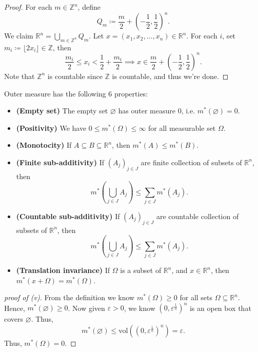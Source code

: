 \begin{proof}
    For each \(m \in \mathbb{Z} ^n\), define 
    \[
        Q_m \coloneqq \frac{m}{2} + \left( -\frac{1}{2}, \frac{1}{2} \right)^n. 
    \] 
    We claim \(\mathbb{R} ^n = \bigcup_{m \in \mathbb{Z} ^n} Q_m \). Let \(x = (x_1, x_2, \dots , x_n) \in \mathbb{R} ^n\). For each \(i\), set \(m_i \coloneqq \lfloor 2x_i \rfloor \in \mathbb{Z} \), then 
    \[
        \frac{m_i}{2} \le x_i < \frac{1}{2} + \frac{m_i}{2} \implies x \in \frac{m}{2} + \left( -\frac{1}{2}, \frac{1}{2} \right)^n. 
    \]
    Note that \(\mathbb{Z} ^n\) is countable since \(\mathbb{Z} \) is countable, and thus we're done.      
\end{proof}

\begin{lemma}
    Outer measure has the following \(6\) properties:
    \begin{itemize}
        \item [(v)] \textbf{(Empty set)} The empty set \(\varnothing \) has outer measure \(0\), i.e. \(m^*(\varnothing ) = 0\).  
        \item [(vi)] \textbf{(Positivity)} We have \(0 \le m^*(\Omega ) \le \infty \) for all measurable set \(\Omega \).  
        \item [(vii)] \textbf{(Monotocity)}  If \(A \subseteq B \subseteq \mathbb{R} ^n\), then \(m^*(A) \le m^*(B)\).  
        \item [(viii)] \textbf{(Finite sub-additivity)} If \((A_j)_{j \in J}\) are finite collection of subsets of \(\mathbb{R} ^n\), then 
        \[
            m^* \left( \bigcup_{j \in J} A_j  \right) \le \sum_{j \in J} m^*(A_j).  
        \]
        \item [(x)] \textbf{(Countable sub-additivity)} If \((A_j)_{j \in J}\) are countable collection of subsets of \(\mathbb{R} ^n\), then 
        \[
            m^* \left( \bigcup_{j \in J} A_j  \right) \le \sum_{j \in J} m^*(A_j).  
        \] 
        \item [(xiii)] \textbf{(Translation invariance)} If \(\Omega \) is a subset of \(\mathbb{R} ^n\), and \(x \in \mathbb{R} ^n\), then \(m^* (x + \Omega ) = m^*(\Omega )\).    
    \end{itemize} 
\end{lemma}

\begin{proof}[proof of (v)]
    From the definition we know \(m^* (\Omega ) \ge 0\) for all sets \(\Omega \subseteq \mathbb{R} ^n \). Hence, \(m^*(\varnothing ) \ge 0\). Now given \(\varepsilon > 0\), we know \(\left( 0, \varepsilon^{\frac{1}{n}} \right)^n \) is an open box that covers \(\varnothing\). Thus,
    \[
        m^* (\varnothing ) \le \mathrm{vol}\left( \left( 0, \varepsilon ^{\frac{1}{n}} \right)^n  \right) = \varepsilon.  
    \]
    Thus, \(m^* (\Omega ) = 0\).        
\end{proof}

